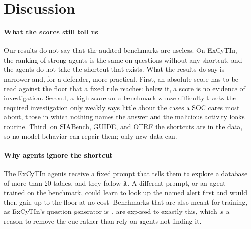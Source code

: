 \section{Discussion}
\label{sec:discussion}

\paragraph{What the scores still tell us} Our results do not say that the audited benchmarks are useless. On ExCyTIn, the ranking of strong agents is the same on questions without any shortcut, and the agents do not take the shortcut that exists. What the results do say is narrower and, for a defender, more practical. First, an absolute score has to be read against the floor that a fixed rule reaches: below it, a score is no evidence of investigation. Second, a high score on a benchmark whose difficulty tracks the required investigation only weakly says little about the cases a SOC cares most about, those in which nothing names the answer and the malicious activity looks routine. Third, on SIABench, GUIDE, and OTRF the shortcuts are in the data, so no model behavior can repair them; only new data can.

\paragraph{Why agents ignore the shortcut} The ExCyTIn agents receive a fixed prompt that tells them to explore a database of more than 20 tables, and they follow it. A different prompt, or an agent trained on the benchmark, could learn to look up the named alert first and would then gain up to the floor at no cost. Benchmarks that are also meant for training, as ExCyTIn's question generator is~\citep{excytin}, are exposed to exactly this, which is a reason to remove the cue rather than rely on agents not finding it.

